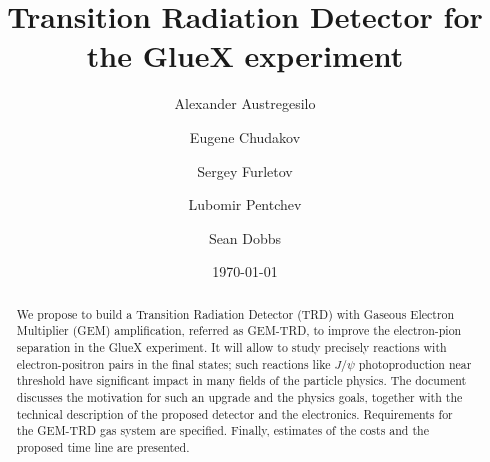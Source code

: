 \documentclass[%
preprint,
nofootinbib,
 amsmath,amssymb,
 aps,
floatfix,
]{revtex4-1}
\begin{document}

\title{ 
Transition Radiation Detector for the GlueX experiment
}%
\author{Alexander Austregesilo}
\author{Eugene Chudakov}
\author{Sergey Furletov}
\author{Lubomir Pentchev}
\author{Sean Dobbs}
%



\date{\today}%

\begin{abstract}
We propose to build a Transition Radiation Detector (TRD) 
with Gaseous Electron Multiplier (GEM) amplification, referred as GEM-TRD,
to improve the electron-pion separation in the GlueX experiment.
It will allow to study precisely reactions with 
electron-positron pairs in the final states; such reactions like
$J/\psi $ photoproduction near threshold have significant impact
in many fields of the particle physics.
The document discusses the motivation for such an upgrade 
and the physics goals, together with  the
technical description of the proposed detector and the electronics. 
Requirements for the GEM-TRD gas system are specified. 
Finally, estimates of the costs and the proposed time line are presented.
\end{abstract}

\maketitle

\tableofcontents
\end{document}
